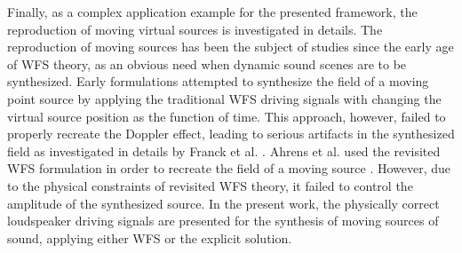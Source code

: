 Finally, as a complex application example for the presented framework, the reproduction of moving virtual sources is investigated in details.
The reproduction of moving sources has been the subject of studies since the early age of WFS theory, as an obvious need when dynamic sound scenes are to be synthesized.
Early formulations attempted to synthesize the field of a moving point source by applying the traditional WFS driving signals with changing the virtual source position as the function of time.
This approach, however, failed to properly recreate the Doppler effect, leading to serious artifacts in the synthesized field as investigated in details by Franck et al. \cite{Franck2007}.
Ahrens et al. used the revisited WFS formulation in order to recreate the field of a moving source \cite{Ahrens2008moving, Ahrens2008moving_b, gasparini2011real, Ahrens2012}.
However, due to the physical constraints of revisited WFS theory, it failed to control the amplitude of the synthesized source.
In the present work, the physically correct loudspeaker driving signals are presented for the synthesis of moving sources of sound, applying either WFS or the explicit solution.

